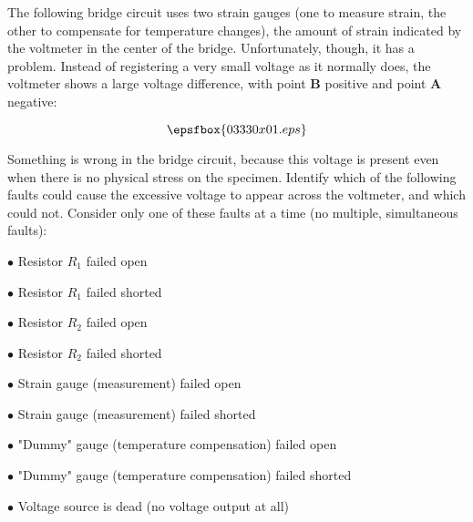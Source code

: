 

The following bridge circuit uses two strain gauges (one to measure strain, the other to compensate for temperature changes), the amount of strain indicated by the voltmeter in the center of the bridge.  Unfortunately, though, it has a problem.  Instead of registering a very small voltage as it normally does, the voltmeter shows a large voltage difference, with point {\bf B} positive and point {\bf A} negative:

$$\epsfbox{03330x01.eps}$$

\goodbreak
Something is wrong in the bridge circuit, because this voltage is present even when there is no physical stress on the specimen.  Identify which of the following faults could cause the excessive voltage to appear across the voltmeter, and which could not.  Consider only one of these faults at a time (no multiple, simultaneous faults):

\medskip
\item{$\bullet$} Resistor $R_1$ failed open
\item{$\bullet$} Resistor $R_1$ failed shorted
\item{$\bullet$} Resistor $R_2$ failed open
\item{$\bullet$} Resistor $R_2$ failed shorted
\item{$\bullet$} Strain gauge (measurement) failed open
\item{$\bullet$} Strain gauge (measurement) failed shorted
\item{$\bullet$} "Dummy" gauge (temperature compensation) failed open
\item{$\bullet$} "Dummy" gauge (temperature compensation) failed shorted
\item{$\bullet$} Voltage source is dead (no voltage output at all)
\medskip







